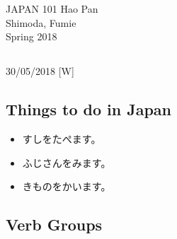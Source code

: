 \documentclass{article}
\begin{document}
 \begin{CJK}{UTF8}{min}

\noindent
{JAPAN 101 \hfill Hao Pan}\\
{Shimoda, Fumie}\\
{Spring 2018}


\begin{center}
\section{}
\noindent
{\hfill 30/05/2018 [W]}
\end{center}

\subsection{Things to do in Japan}

\begin{itemize}
\item すしをたぺます。
\item ふじさんをみます。
\item きものをかいます。
\end{itemize}

\subsection{Verb Groups}


\end{CJK}
\end{document}
